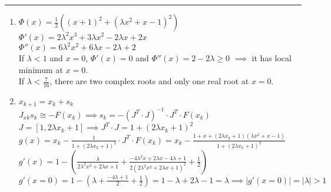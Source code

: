 \documentclass[11pt]{article}
\begin{document}





\begin{quote}

\end{quote}

\hrule

\begin{solution}
\item 

\begin{enumerate}
    \item $\Phi(x) = \frac{1}{2}((x+1)^2 + (\lambda x^2 + x - 1)^2)$\\
    $\Phi'(x) = 2 \lambda^2 x^3 + 3 \lambda x^2 - 2 \lambda x + 2x$\\
    $\Phi''(x) = 6 \lambda^2 x^2 + 6\lambda x - 2\lambda + 2$\\
    
    If $\lambda < 1$ and $x = 0$, $\Phi'(x) = 0$ and $\Phi''(x) = 2 - 2\lambda \geq 0$ $\implies$ it has local minimum at $x = 0$.\\
    
    If $\lambda < \frac{7}{16}$, there are two complex roots and only one real root at $x = 0$.\\
    
    \item  $x_{k+1} = x_k + s_k$\\
    $J_{xk}s_k \cong -F(x_k) \implies s_k =- (J^T \cdot J)^{-1}\cdot J^T \cdot F(x_k)$\\
    $J = [1 ,2 \lambda x_k + 1] \implies J^T\cdot J = 1 + (2 \lambda x_k + 1)^2$\\
    $g(x) = x_k - \frac{1}{1 + (2 \lambda x_k + 1)^2}\cdot J^T \cdot F(x_k) = x_k - \frac{1 + x + (2 \lambda x_k + 1)(\lambda x^2 + x - 1)}{1 + (2 \lambda x_k + 1)^2}$\\
    $g'(x) = 1 - (\frac{\lambda}{2\lambda^2x^2+2\lambda x+1} + \frac{-4 \lambda^2 x + 2\lambda x- 4\lambda + 1}{2(2\lambda^2 x^2+2\lambda x+ 1)^2} + \frac{1}{2})$\\
    $g'(x = 0) = 1 - (\lambda + \frac{-4\lambda + 1}{2} + \frac{1}{2}) = 1 - \lambda + 2\lambda - 1 = \lambda \implies |g'(x = 0)| = |\lambda| > 1 $ \\
    

\end{enumerate}
\end{solution}
\end{document}
